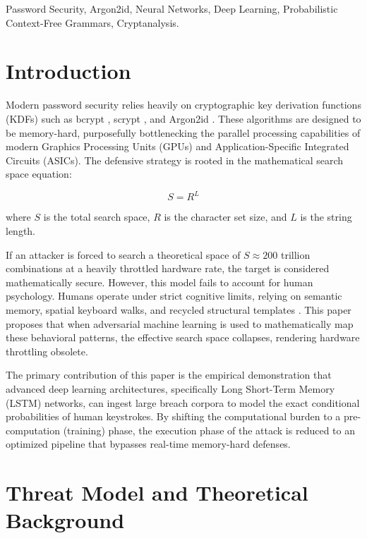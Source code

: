 \documentclass[conference]{IEEEtran}
\begin{document}
\begin{IEEEkeywords}
Password Security, Argon2id, Neural Networks, Deep Learning, Probabilistic Context-Free Grammars, Cryptanalysis.
\end{IEEEkeywords}

\section{Introduction}
Modern password security relies heavily on cryptographic key derivation functions (KDFs) such as bcrypt \cite{provos1999}, scrypt \cite{percival2009}, and Argon2id \cite{argon2}. These algorithms are designed to be memory-hard, purposefully bottlenecking the parallel processing capabilities of modern Graphics Processing Units (GPUs) and Application-Specific Integrated Circuits (ASICs). The defensive strategy is rooted in the mathematical search space equation:

\begin{equation}
S = R^L
\end{equation}

where $S$ is the total search space, $R$ is the character set size, and $L$ is the string length.

If an attacker is forced to search a theoretical space of $S \approx 200$ trillion combinations at a heavily throttled hardware rate, the target is considered mathematically secure. However, this model fails to account for human psychology. Humans operate under strict cognitive limits, relying on semantic memory, spatial keyboard walks, and recycled structural templates \cite{bonneau2012}. This paper proposes that when adversarial machine learning is used to mathematically map these behavioral patterns, the effective search space collapses, rendering hardware throttling obsolete. 

The primary contribution of this paper is the empirical demonstration that advanced deep learning architectures, specifically Long Short-Term Memory (LSTM) networks, can ingest large breach corpora to model the exact conditional probabilities of human keystrokes. By shifting the computational burden to a pre-computation (training) phase, the execution phase of the attack is reduced to an optimized pipeline that bypasses real-time memory-hard defenses.

\section{Threat Model and Theoretical Background}
\end{document}
